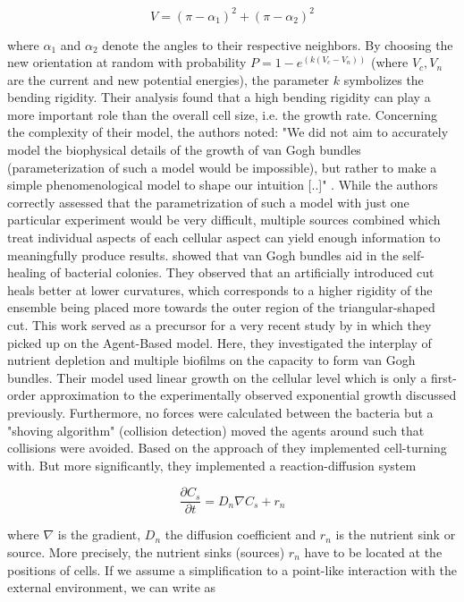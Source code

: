 \documentclass{article}
\begin{document}
\begin{equation}
    V = (\pi - \alpha_1)^2 + (\pi - \alpha_2)^2
\end{equation}

where $\alpha_1$ and $\alpha_2$ denote the angles to their respective neighbors.
By choosing the new orientation at random with probability $P=1-e^(k(V_c-V_n))$ (where $V_c,V_n$ are the current and new potential energies), the parameter $k$ symbolizes the bending rigidity.
Their analysis found that a high bending rigidity can play a more important role than the overall cell size, i.e.
the growth rate.
Concerning the complexity of their model, the authors noted: "We did not aim to accurately model the biophysical details of the growth of van Gogh bundles (parameterization of such a model would be impossible), but rather to make a simple phenomenological model to shape our intuition [..]" \cite{vanGestel2015}.
While the authors correctly assessed that the parametrization of such a model with just one particular experiment would be very difficult, multiple sources combined which treat individual aspects of each cellular aspect can yield enough information to meaningfully produce results.
\cite{Dong2022} showed that van Gogh bundles aid in the self-healing of bacterial colonies.
They observed that an artificially introduced cut heals better at lower curvatures, which corresponds to a higher rigidity of the ensemble being placed more towards the outer region of the triangular-shaped cut.
This work served as a precursor for a very recent study by \cite{Li2025} in which they picked up on the Agent-Based model.
Here, they investigated the interplay of nutrient depletion and multiple biofilms on the capacity to form van Gogh bundles.
Their model used linear growth on the cellular level which is only a first-order approximation to the experimentally observed exponential growth discussed previously.
Furthermore, no forces were calculated between the bacteria but a "shoving algorithm" (collision detection) moved the agents around such that collisions were avoided.
Based on the approach of \cite{vanGestel2015} they implemented cell-turning with.
But more significantly, they implemented a reaction-diffusion system

\begin{equation}
    \frac{\partial C_s}{\partial t} = D_n \nabla C_s + r_n
\end{equation}

where $\nabla$ is the gradient, $D_n$ the diffusion coefficient and $r_n$ is the nutrient sink or source.
More precisely, the nutrient sinks (sources) $r_n$ have to be located at the positions of cells.
If we assume a simplification to a point-like interaction with the external environment, we can write as
\end{document}
